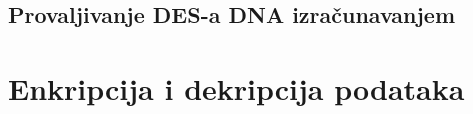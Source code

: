 \documentclass[a4paper,oneside,12pt]{memoir} %
\begin{document}
\begin{spacing}{1.5}
\subsection{Provaljivanje DES-a DNA izračunavanjem}
\section{Enkripcija i dekripcija podataka}

\newpage
\nocite{*}


\end{spacing}
\end{document}

